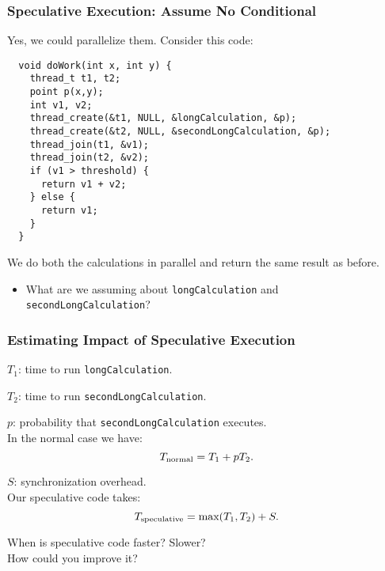 \begin{frame}[fragile]
  \frametitle{Speculative Execution: Assume No Conditional}

  
  Yes, we could parallelize them. Consider this code:
    
    \begin{lstlisting}
  void doWork(int x, int y) {
    thread_t t1, t2;
    point p(x,y);
    int v1, v2;
    thread_create(&t1, NULL, &longCalculation, &p);
    thread_create(&t2, NULL, &secondLongCalculation, &p);
    thread_join(t1, &v1);
    thread_join(t2, &v2);
    if (v1 > threshold) {
      return v1 + v2;
    } else {
      return v1;
    }
  }
    \end{lstlisting}

  We do both the calculations in parallel and return the same result as before.

  \begin{itemize}
    \item What are we assuming about {\tt longCalculation} and
{\tt secondLongCalculation}?
  \end{itemize}
  
\end{frame}

\begin{frame}
  \frametitle{Estimating Impact of Speculative Execution}

  
  $T_1$: time to run {\tt longCalculation}.

  $T_2$: time to run {\tt secondLongCalculation}.

  $p$: probability that {\tt secondLongCalculation} executes.\\[1em]

  In the normal case we have:
    \[T_{\mbox{\scriptsize normal}} = T_1 + pT_2.\]

  $S$: synchronization overhead.\\
  Our speculative code takes:
    \[ T_{\mbox{\scriptsize speculative}} = \mbox{max}(T_1, T_2) + S.\]

     When is speculative code faster? Slower? \\ How could you improve it?

  
\end{frame}

